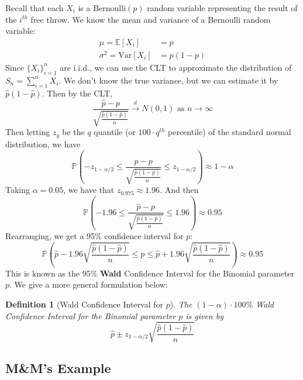 \documentclass[twoside]{article}
\newtheorem{definition}[theorem]{Definition}
\theoremstyle{definition}
\begin{document}
Recall that each $X_i$ is a Bernoulli$(p)$ random variable representing the result of the $i^{th}$ free throw. We know the mean and variance of a Bernoulli random variable:
\begin{align}
   \mu = \mathbb{E}[X_i] &= p \\
   \sigma^2 = \text{Var}[X_i] &= p(1-p)
\end{align}
Since $\{X_i\}_{i=1}^n$ are i.i.d., we can use the CLT to approximate the distribution of $S_n = \sum_{i=1}^n X_i$. We don't know the true variance, but we can estimate it by $\widehat{p}(1-\widehat{p})$. Then by the CLT,
\begin{equation}
   \frac{\widehat{p} - p}{\sqrt{\frac{\widehat{p}(1-\widehat{p})}{n}}} \xrightarrow{d} N(0, 1) \text{ as } n \to \infty
\end{equation}
Then letting $z_{q}$ be the $q$ quantile (or $100\cdot q^{th}$ percentile) of the standard normal distribution, we have
\begin{equation}
   \mathbb{P}\left(-z_{1-\alpha/2} \leq \frac{\widehat{p} - p}{\sqrt{\frac{\widehat{p}(1-\widehat{p})}{n}}} \leq z_{1-\alpha/2}\right) \approx 1 - \alpha
\end{equation}
Taking $\alpha = 0.05$, we have that $z_{0.975} \approx 1.96$. And then
\begin{equation}
   \mathbb{P}\left(-1.96 \leq \frac{\widehat{p} - p}{\sqrt{\frac{\widehat{p}(1-\widehat{p})}{n}}} \leq 1.96\right) \approx 0.95
\end{equation}
Rearranging, we get a 95\% confidence interval for $p$:
\begin{equation}
   \mathbb{P}\left(\widehat{p} - 1.96\sqrt{\frac{\widehat{p}(1-\widehat{p})}{n}} \leq p \leq \widehat{p} + 1.96\sqrt{\frac{\widehat{p}(1-\widehat{p})}{n}}\right) \approx 0.95
\end{equation}
This is known as the 95\% \textbf{Wald} Confidence Interval for the Binomial parameter $p$. We give a more general formulation below:
\begin{definition}[Wald Confidence Interval for $p$]\label{def:wald-ci}
   The $(1-\alpha)\cdot 100\%$ Wald Confidence Interval for the Binomial parameter $p$ is given by
   \begin{equation}
      \widehat{p} \pm z_{1-\alpha/2} \sqrt{\frac{\widehat{p}(1-\widehat{p})}{n}}
   \end{equation}
\end{definition}

\subsection{M\&M's Example}
\end{document}
